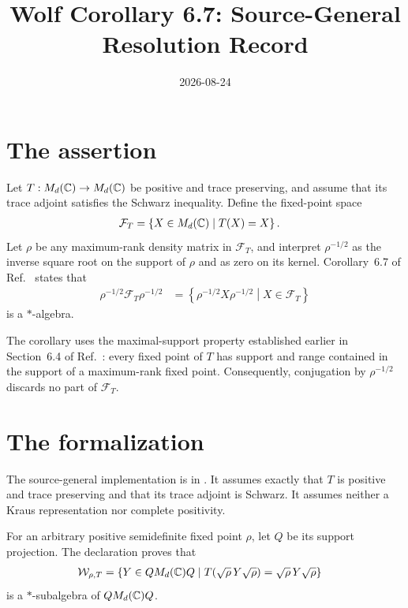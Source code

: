 \documentclass[11pt]{article}
\title{Wolf Corollary 6.7: Source-General Resolution Record}
\author{}
\date{2026-08-24}
\begin{document}
\maketitle
{}

\section{The assertion}

Let $T:M_{d}(\mathbb{C})\to M_{d}(\mathbb{C})$ be positive and trace preserving, and assume that its
trace adjoint satisfies the Schwarz inequality. Define the fixed-point space
\begin{align}
    \mathcal F_T
        &=\left\{X\in M_{d}(\mathbb{C})\mathrel{}\middle|\mathrel{}T(X)=X\right\}.
    \label{eq:wolf_cor67_maximal_support_restriction_fixed_point_space}
\end{align}
Let $\rho$ be any maximum-rank density matrix in $\mathcal F_T$, and interpret
$\rho^{-1/2}$ as the inverse square root on the support of $\rho$ and as zero
on its kernel. Corollary~6.7 of Ref.~\cite{Wolf2012Quantum} states that
\begin{align}
    \rho^{-1/2}\mathcal F_T\rho^{-1/2}
        &=
        \left\{\rho^{-1/2}X\rho^{-1/2}
            \mathrel{}\middle|\mathrel{}
            X\in\mathcal F_T\right\}
    \label{eq:wolf_cor67_maximal_support_restriction_inverse_sandwich_set}
\end{align}
is a $*$-algebra.

The corollary uses the maximal-support property established earlier in
Section~6.4 of Ref.~\cite{Wolf2012Quantum}: every fixed point of $T$ has
support and range contained in the support of a maximum-rank fixed point.
Consequently, conjugation by $\rho^{-1/2}$ discards no part of
$\mathcal F_T$.

\section{The formalization}

The source-general implementation is in
. It assumes
exactly that $T$ is positive and trace preserving and that its trace adjoint is
Schwarz. It assumes neither a Kraus representation nor complete positivity.

For an arbitrary positive semidefinite fixed point $\rho$, let $Q$ be its
support projection. The declaration
 proves that
\begin{align}
    \mathcal W_{\rho,T}
        &=
        \left\{Y\in QM_{d}(\mathbb{C})Q
            \mathrel{}\middle|\mathrel{}
            T(\sqrt{\rho}\,Y\sqrt{\rho})
                =\sqrt{\rho}\,Y\sqrt{\rho}\right\}
    \label{eq:wolf_cor67_maximal_support_restriction_weighted_corner_carrier}
\end{align}
is a $*$-subalgebra of $QM_{d}(\mathbb{C})Q$.
\end{document}
